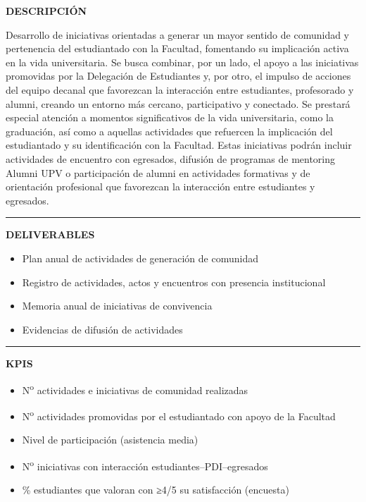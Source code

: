 \documentclass[11pt,a4paper]{scrreprt}
\newcommand{\fieldlabel}[1]{%
  {\footnotesize\sffamily\bfseries\color{mutedcolor}\MakeUppercase{#1}}\par\nopagebreak[4]
}
\newcommand{\fieldsep}{\vspace{3pt}\noindent\textcolor{bordercolor}{\rule{\linewidth}{0.4pt}}\vspace{3pt}\par}
\begin{document}
\begin{tcolorbox}[pabox={e360color}{PA3.1 \enspace\textbullet\enspace Generación de comunidad y sentido de pertenencia en la Facultad}]

\fieldlabel{Descripci\'on}
{\small Desarrollo de iniciativas orientadas a generar un mayor sentido de comunidad y pertenencia del estudiantado con la Facultad, fomentando su implicación activa en la vida universitaria. Se busca combinar, por un lado, el apoyo a las iniciativas promovidas por la Delegación de Estudiantes y, por otro, el impulso de acciones del equipo decanal que favorezcan la interacción entre estudiantes, profesorado y alumni, creando un entorno más cercano, participativo y conectado. Se prestará especial atención a momentos significativos de la vida universitaria, como la graduación, así como a aquellas actividades que refuercen la implicación del estudiantado y su identificación con la Facultad. Estas iniciativas podrán incluir actividades de encuentro con egresados, difusión de programas de mentoring Alumni UPV o participación de alumni en actividades formativas y de orientación profesional que favorezcan la interacción entre estudiantes y egresados. }\par
\fieldsep
\fieldlabel{Deliverables}
{\small \begin{itemize}[noitemsep,topsep=2pt]
\item Plan anual de actividades de generación de comunidad
\item Registro de actividades, actos y encuentros con presencia institucional
\item Memoria anual de iniciativas de convivencia
\item Evidencias de difusión de actividades
\end{itemize}}\par
\fieldsep
\fieldlabel{KPIs}
{\small \begin{itemize}[noitemsep,topsep=2pt]
\item N\textsuperscript{o} actividades e iniciativas de comunidad realizadas
\item N\textsuperscript{o} actividades promovidas por el estudiantado con apoyo de la Facultad
\item Nivel de participación (asistencia media)
\item N\textsuperscript{o} iniciativas con interacción estudiantes--PDI--egresados
\item \% estudiantes que valoran con ≥4/5 su satisfacción (encuesta)
\end{itemize}}\par
\end{tcolorbox}
\end{document}
